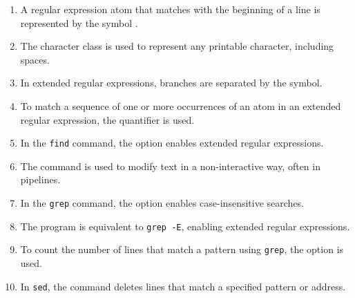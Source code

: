 \documentclass[a4paper]{report}
\begin{document}
\begin{enumerate}[1.]
\item A regular expression atom that matches with the beginning of a line is represented by the symbol \underline{\hspace{2cm}}.

\item The character class \underline{\hspace{2cm}} is used to represent any printable character, including spaces.

\item In extended regular expressions, branches are separated by the \underline{\hspace{2cm}} symbol.

\item To match a sequence of one or more occurrences of an atom in an extended regular expression, the quantifier \underline{\hspace{2cm}} is used.

\item In the \texttt{find} command, the option \underline{\hspace{2cm}} enables extended regular expressions.

\item The command \underline{\hspace{2cm}} is used to modify text in a non-interactive way, often in pipelines.

\item In the \texttt{grep} command, the \underline{\hspace{2cm}} option enables case-insensitive searches.

\item The \underline{\hspace{2cm}} program is equivalent to \texttt{grep -E}, enabling extended regular expressions.

\item To count the number of lines that match a pattern using \texttt{grep}, the \underline{\hspace{2cm}} option is used.

\item In \texttt{sed}, the \underline{\hspace{2cm}} command deletes lines that match a specified pattern or address.
\end{enumerate}


\newpage
\end{document}
